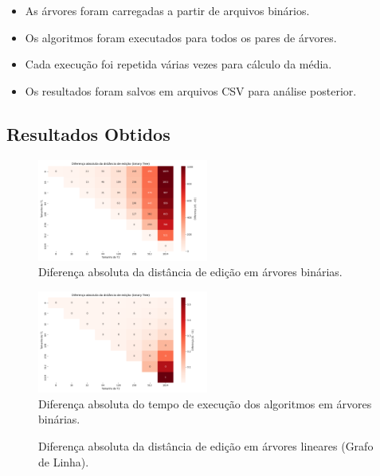 \documentclass{sbc2023}%
\begin{document}
\begin{itemize}
\item As árvores foram carregadas a partir de arquivos binários.
\item Os algoritmos foram executados para todos os pares de árvores.
\item Cada execução foi repetida várias vezes para cálculo da média.
\item Os resultados foram salvos em arquivos CSV para análise posterior.
\end{itemize}

\subsection{Resultados Obtidos}

\begin{figure}[htbp]
    \centering
    \includegraphics[width=0.5\textwidth]{images/heatmap_diff_edit_distance_binary_tree.png}
    \caption{ Diferença absoluta da distância de edição em árvores binárias. }
    \label{fig:exemplo}
\end{figure}

\begin{figure}[htbp]
    \centering
    \includegraphics[width=0.5\textwidth]{images/heatmap_diff_time_taken_binary_tree.png}
    \caption{ Diferença absoluta do tempo de execução dos algoritmos em árvores binárias. }
    \label{fig:exemplo}
\end{figure}


\begin{figure}[htbp]
    \centering
    \caption{ Diferença absoluta da distância de edição em árvores lineares (Grafo de Linha). }
    \label{fig:exemplo}
\end{figure}
\end{document}
